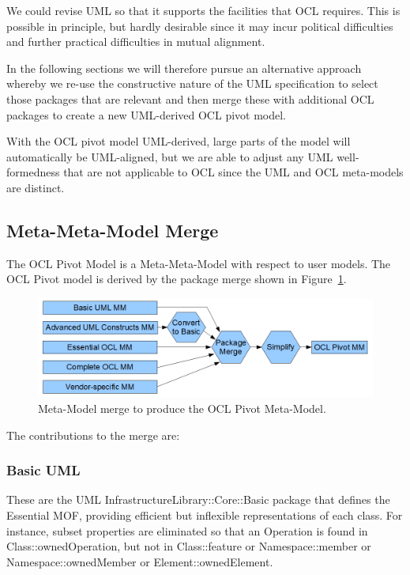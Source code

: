 \documentclass{eceasst}
\begin{document}
We could revise UML so that it supports the facilities that OCL requires. This is possible in principle, but hardly desirable since it may incur political difficulties and further practical difficulties in mutual alignment.

In the following sections we will therefore pursue an alternative approach whereby we re-use the constructive nature of the UML specification to select those packages that are relevant and then merge these with additional OCL packages to create a new UML-derived OCL pivot model.

With the OCL pivot model UML-derived, large parts of the model will automatically be UML-aligned, but we are able to adjust any UML well-formedness that are not applicable to OCL since the UML and OCL meta-models are distinct.

\subsection{Meta-Meta-Model Merge}

The OCL Pivot Model is a Meta-Meta-Model with respect to user models. The OCL Pivot model is derived by the package merge  shown in Figure~\ref{fig:UMLMMtoOCLMM}.

\begin{figure}
  \begin{center}
    \includegraphics[width=5.75in]{UMLMMtoOCLMM.png}
  \end{center}
  \caption{Meta-Model merge to produce the OCL Pivot Meta-Model.}
  \label{fig:UMLMMtoOCLMM}
\end{figure}

The contributions to the merge are:

\subsubsection{Basic UML}

These are the UML InfrastructureLibrary::Core::Basic package that defines the Essential MOF, providing efficient but inflexible representations of each class. For instance, subset properties are eliminated so that an Operation is found in Class::ownedOperation, but not in Class::feature or Namespace::member or Namespace::ownedMember or Element::ownedElement.
\end{document}
